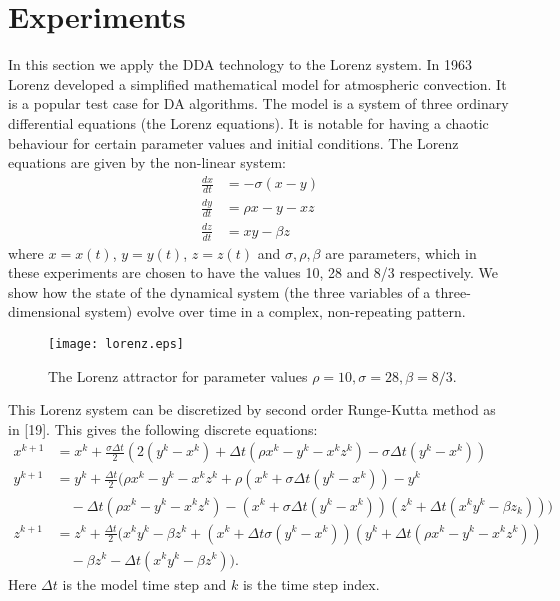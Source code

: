 \documentclass[english]{article}
\begin{document}


\newpage
\section{Experiments}
In this section we apply the DDA technology to the Lorenz system. In 1963 Lorenz developed a simplified mathematical model for atmospheric convection. It is a popular test case for DA algorithms. The model is a system of three ordinary differential equations (the Lorenz equations). It is notable for having a chaotic behaviour for certain parameter values and initial conditions. The Lorenz equations are given by the non-linear system:
\begin{align} \label{lorenz_x}
	\frac{dx}{dt} &= - \sigma(x-y)\\ \label{lorenz_y}
	\frac{dy}{dt} &= \rho x - y - xz\\\label{lorenz_z}
	\frac{dz}{dt} &= xy -\beta z
\end{align}
where $x = x(t)$, $y = y(t)$, $z = z(t)$ and $\sigma,\rho,\beta$ are parameters, which in these experiments are chosen to have the values 10, 28 and 8/3 respectively. We show how the state of the dynamical system (the three variables of a three-dimensional system) evolve over time in a complex, non-repeating pattern.
\begin{figure}[h]
	\centering
	\texttt{[image: lorenz.eps]}
	\caption{The Lorenz attractor for parameter values $\rho=10, \sigma=28, \beta=8/3$.}
\end{figure}

This Lorenz system can be discretized by second order Runge-Kutta method as in [19]. This gives the following discrete equations:
\begin{align}\label{discrete_lorenz_x}
	x^{k+1} &= x^k + \frac{\sigma\Delta t}{2} \left( 2(y^k - x^k) + \Delta t(\rho x^k - y^k - x^kz^k) -\sigma \Delta t(y^k - x^k)\right) \\ \nonumber \label{discrete_lorenz_y}
	y^{k+1} &= y^k + \frac{\Delta t}{2} \big(\rho x^k - y^k - x^kz^k + \rho(x^k + \sigma\Delta t(y^k -x^k))-y^k \\ &\quad - \Delta t (\rho x^k -y^k -x^kz^k) - (x^k + \sigma\Delta t(y^k - x^k))(z^k + \Delta t(x^ky^k - \beta z_k))\big)   \\ \nonumber \label{discrete_lorenz_z}
	z^{k+1} &= z^k + \frac{\Delta t}{2} \big( x^ky^k -\beta z^k + (x^k + \Delta t \sigma(y^k-x^k))(y^k+\Delta t (\rho x^k - y^k - x^kz^k)) \\
	&\quad -\beta z^k -\Delta t (x^ky^k - \beta z^k)\big).
\end{align}
Here $\Delta t$ is the model time step and $k$ is the time step index. 
\end{document}
